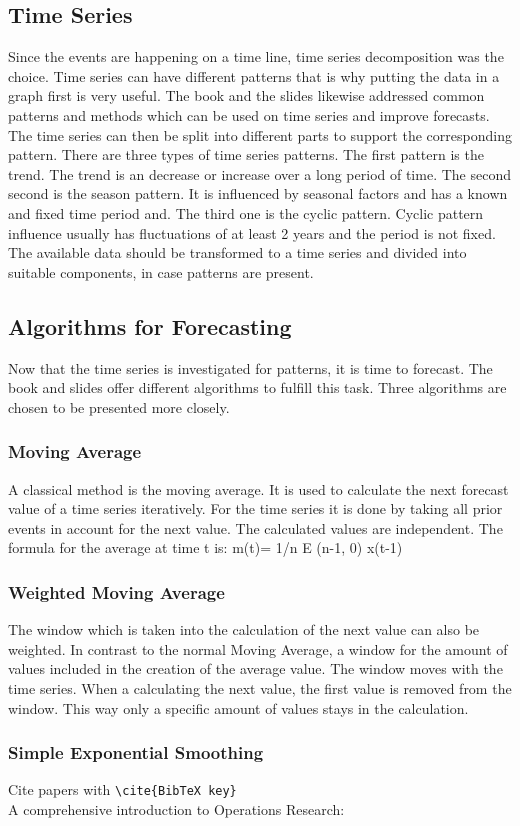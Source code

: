 \subsection{Time Series}\label{subsection:Time Series}
Since the events are happening on a time line, time series decomposition was the choice. Time series can have different patterns that is why putting the data in a graph first is very useful. The book and the slides likewise addressed common patterns and methods which can be used on time series and improve forecasts.
The time series can then be split into different parts to support the corresponding pattern. There are three types of time series patterns. The first pattern is the trend. The trend is an decrease or increase over a long period of time. The second second is the season pattern. It is influenced by seasonal factors and has a known and fixed time period and. The third one is the cyclic pattern. Cyclic pattern influence usually has fluctuations of at least 2 years and the period is not fixed. The available data should be transformed to a time series and divided into suitable components, in case patterns are present.
\subsection{Algorithms for Forecasting}\label{subsection:Algorithms for Forecasting}
Now that the time series is investigated for patterns, it is time to forecast. The book and slides offer different algorithms to fulfill this task. Three algorithms are chosen to be presented more closely.
\subsubsection{Moving Average}\label{subsubsection:Moving Average}
A classical method is the moving average. It is used to calculate the next forecast value of a time series iteratively. For the time series it is done by taking all prior events in account for the next value. The calculated values are independent. The formula for the average at time t is: m(t)= 1/n E (n-1, 0) x(t-1)
\subsubsection{Weighted Moving Average}\label{subsubsection:Weighted Moving Average}
The window which is taken into the calculation of the next value can also be weighted. In contrast to the normal Moving Average, a window for the amount of values included in the creation of the average value. The window moves with the time series. When a calculating the next value, the first value is removed from the window. This way only a specific amount of values stays in the calculation.
\subsubsection{Simple Exponential Smoothing}\label{subsubsection:Simple Exponential Smoothing}

Cite papers with \verb+\cite{BibTeX key}+\\
A comprehensive introduction to Operations Research:
